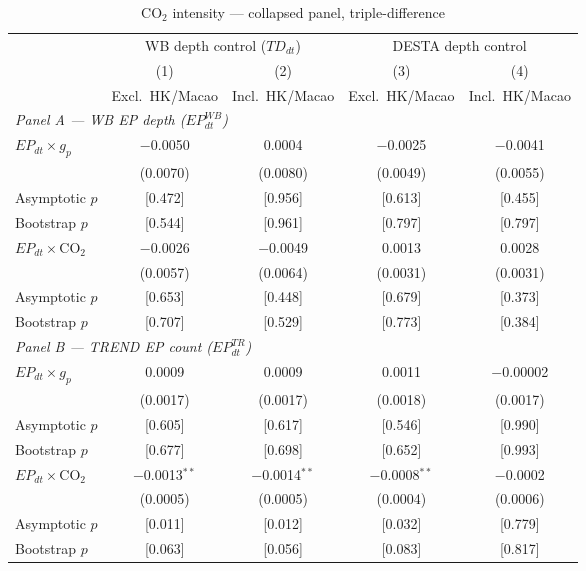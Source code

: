 \begin{table}[htbp]
\centering
\footnotesize
\caption{CO$_2$ intensity \citep{shapiro2021} --- collapsed panel, triple-difference}
\label{tab:co2}
\begin{threeparttable}
\begin{tabular}{lcccc}
\toprule
 & \multicolumn{2}{c}{WB depth control ($TD_{dt}$)} & \multicolumn{2}{c}{DESTA depth control} \\
\cmidrule(lr){2-3}\cmidrule(lr){4-5}
 & (1) & (2) & (3) & (4) \\
 & Excl.\ HK/Macao & Incl.\ HK/Macao & Excl.\ HK/Macao & Incl.\ HK/Macao \\
\midrule
\multicolumn{5}{l}{\textit{Panel A --- WB EP depth ($EP^{WB}_{dt}$)}} \\[3pt]
$EP_{dt} \times g_p$ & $-$0.0050 & 0.0004 & $-$0.0025 & $-$0.0041 \\
 & (0.0070) & (0.0080) & (0.0049) & (0.0055) \\[2pt]
\quad Asymptotic $p$ & [0.472] & [0.956] & [0.613] & [0.455] \\
\quad Bootstrap $p$ & [0.544] & [0.961] & [0.797] & [0.797] \\[6pt]
$EP_{dt} \times \text{CO}_2$ & $-$0.0026 & $-$0.0049 & 0.0013 & 0.0028 \\
 & (0.0057) & (0.0064) & (0.0031) & (0.0031) \\[2pt]
\quad Asymptotic $p$ & [0.653] & [0.448] & [0.679] & [0.373] \\
\quad Bootstrap $p$ & [0.707] & [0.529] & [0.773] & [0.384] \\[6pt]
\midrule
\multicolumn{5}{l}{\textit{Panel B --- TREND EP count ($EP^{TR}_{dt}$)}} \\[3pt]
$EP_{dt} \times g_p$ & 0.0009 & 0.0009 & 0.0011 & $-$0.00002 \\
 & (0.0017) & (0.0017) & (0.0018) & (0.0017) \\[2pt]
\quad Asymptotic $p$ & [0.605] & [0.617] & [0.546] & [0.990] \\
\quad Bootstrap $p$ & [0.677] & [0.698] & [0.652] & [0.993] \\[6pt]
$EP_{dt} \times \text{CO}_2$ & $-$0.0013$^{**}$ & $-$0.0014$^{**}$ & $-$0.0008$^{**}$ & $-$0.0002 \\
 & (0.0005) & (0.0005) & (0.0004) & (0.0006) \\[2pt]
\quad Asymptotic $p$ & [0.011] & [0.012] & [0.032] & [0.779] \\
\quad Bootstrap $p$ & [0.063] & [0.056] & [0.083] & [0.817] \\[6pt]

\end{tabular}
\end{threeparttable}
\end{table}
